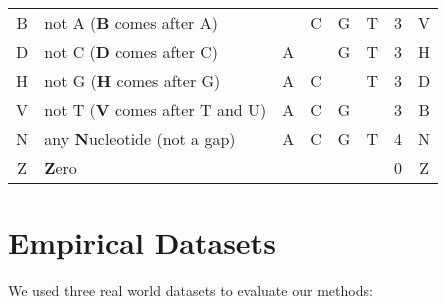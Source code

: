 \begin{table}[htb]
{\begin{center}
\begin{tabular}{c|l|cccc|c|c}
    \hline
    B & not A (\textbf{B} comes after A) &  & \rb{} C & \rb{} G & \rb{} T & 3 & V \\
    D & not C (\textbf{D} comes after C) & \rb{} A &  & \rb{} G & \rb{} T & 3 & H \\
    H & not G (\textbf{H} comes after G) & \rb{} A & \rb{} C &  & \rb{} T & 3 & D \\
    V & not T (\textbf{V} comes after T and U) & \rb{} A & \rb{} C & \rb{} G &  & 3 & B \\
    \hline
    N & any \textbf{N}ucleotide (not a gap) & \rb{} A & \rb{} C & \rb{} G & \rb{} T & 4 & N \\
    Z & \textbf{Z}ero &  &  &  &  & 0 & Z
    \end{tabular}
    \end{center}
}
\end{table}



\chapter{Empirical Datasets}
\label{ch:EmpiricalDatasets}


We used three %
real world datasets to evaluate our methods:

